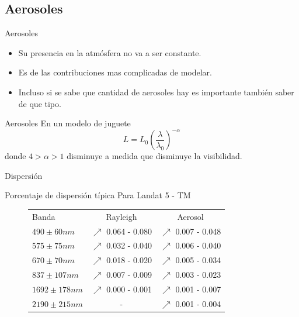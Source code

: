 \documentclass[]{beamer}
\begin{document}
\subsection{Aerosoles}

\begin{frame}{Aerosoles}
  \begin{itemize}
    \item Su presencia en la atmósfera no va a ser constante.
    \item Es de las contribuciones mas complicadas de modelar.
    \item Incluso si se sabe que cantidad de aerosoles hay es importante también saber de que tipo.
  \end{itemize}
\end{frame}

\begin{frame}{Aerosoles}
  En un modelo de juguete
  \begin{equation}
    L = L_0 \left( \frac{\lambda}{\lambda_0} \right)^{-\alpha}
  \end{equation}
  donde $4 > \alpha > 1$ disminuye a medida que disminuye la visibilidad.
\end{frame}

\begin{frame}{Dispersión}
  \begin{exampleblock}{Porcentaje de dispersión típica}
    Para Landat 5 - TM
    \begin{figure}
      \begin{tabular}{l c c}
        Banda & Rayleigh  & Aerosol    \\
        $490\pm60 nm$& $\nearrow$ 0.064 - 0.080   & $\nearrow$ 0.007 - 0.048 \\
        $575\pm75 nm$& $\nearrow$ 0.032 - 0.040   & $\nearrow$ 0.006 - 0.040  \\
        $670\pm70 nm$& $\nearrow$ 0.018 - 0.020   & $\nearrow$ 0.005 - 0.034 \\
        $837\pm107 nm$& $\nearrow$ 0.007 - 0.009  & $\nearrow$ 0.003 - 0.023 \\
        $1692\pm178 nm$& $\nearrow$ 0.000 - 0.001  & $\nearrow$ 0.001 - 0.007 \\
        $2190\pm215 nm$& -                         & $\nearrow$ 0.001 - 0.004 \\
      \end{tabular}
    \end{figure}
  \end{exampleblock}
\end{frame}
\end{document}
